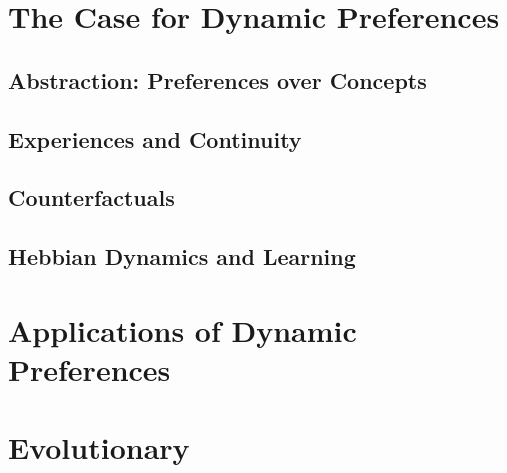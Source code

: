 \documentclass{article}
\begin{document}
	\section{The Case for Dynamic Preferences}
	\subsection{Abstraction: Preferences over Concepts}
	\subsection{Experiences and Continuity}
	\subsection{Counterfactuals}
	\subsection{Hebbian Dynamics and Learning}
		
	\section{Applications of Dynamic Preferences}
	\section{Evolutionary}
	\subsection{}
	

	
\end{document}
